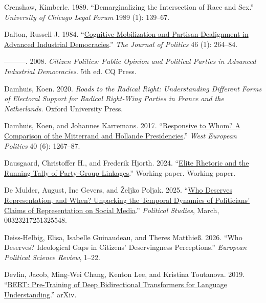 \documentclass[12pt]{article}
\newlength{\cslhangindent}
\newenvironment{CSLReferences}[2]
  {\begin{list}{}{%
    \setlength{\itemindent}{0pt}
    \setlength{\leftmargin}{0pt}
    \setlength{\parsep}{0pt}
    \ifodd #1
      \setlength{\leftmargin}{\cslhangindent}
      \setlength{\itemindent}{-\cslhangindent}
    \fi
    \setlength{\itemsep}{#2\baselineskip}}}
  {\end{list}}
\begin{document}
\begin{CSLReferences}{1}{0}
Crenshaw, Kimberle. 1989. {``Demarginalizing the Intersection of Race and Sex.''} \emph{University of Chicago Legal Forum} 1989 (1): 139--67.

Dalton, Russell J. 1984. {``\href{https://doi.org/10.2307/2130444}{Cognitive Mobilization and Partisan Dealignment in Advanced Industrial Democracies}.''} \emph{The Journal of Politics} 46 (1): 264--84.

---------. 2008. \emph{Citizen Politics: Public Opinion and Political Parties in Advanced Industrial Democracies}. 5th ed. {CQ} Press.

Damhuis, Koen. 2020. \emph{Roads to the Radical Right: Understanding Different Forms of Electoral Support for Radical Right-Wing Parties in France and the Netherlands}. Oxford University Press.

Damhuis, Koen, and Johannes Karremans. 2017. {``\href{https://doi.org/10.1080/01402382.2017.1300472}{Responsive to Whom? A Comparison of the Mitterrand and Hollande Presidencies}.''} \emph{West European Politics} 40 (6): 1267--87.

Dausgaard, Christoffer H., and Frederik Hjorth. 2024. {``\href{https://fghjorth.github.io/workingpapers/runningtally.pdf}{Elite Rhetoric and the Running Tally of Party-Group Linkages}.''} Working paper. Working paper.

De Mulder, August, Ine Gevers, and Željko Poljak. 2025. {``\href{https://doi.org/10.1177/00323217251325548}{Who Deserves Representation, and When? Unpacking the Temporal Dynamics of Politicians' Claims of Representation on Social Media}.''} \emph{Political Studies}, March, 00323217251325548.

Deiss-Helbig, Elisa, Isabelle Guinaudeau, and Theres Matthieß. 2026. {``Who Deserves? Ideological Gaps in Citizens' Deservingness Perceptions.''} \emph{European Political Science Review}, 1--22.

Devlin, Jacob, Ming-Wei Chang, Kenton Lee, and Kristina Toutanova. 2019. {``\href{https://doi.org/10.48550/arXiv.1810.04805}{{BERT}: Pre-Training of Deep Bidirectional Transformers for Language Understanding}.''} {arXiv}.


\end{CSLReferences}
\end{document}

